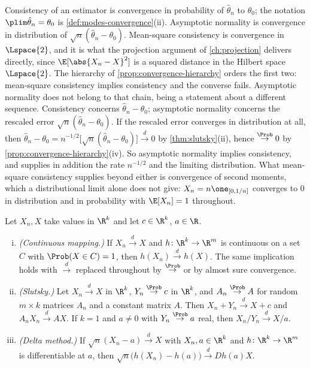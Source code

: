 \begin{remark}\label{rem:modes-econometrics}
	Consistency of an estimator is convergence in probability of
	$\hat\theta_n$ to $\theta_0$; the notation $\plim\hat\theta_n=\theta_0$ is
	\autoref{def:modes-convergence}(ii). Asymptotic normality is convergence in
	distribution of $\sqrt n(\hat\theta_n-\theta_0)$. Mean-square consistency is
	convergence in $\Lspace{2}$, and it is what the projection argument of
	\autoref{ch:projection} delivers directly, since
	$\E[\abs{X_n-X}^{2}]$ is a squared distance in the Hilbert space
	$\Lspace{2}$. The hierarchy of \autoref{prop:convergence-hierarchy} orders
	the first two: mean-square consistency implies consistency and the converse
	fails. Asymptotic normality does not belong to that chain, being a statement
	about a different sequence. Consistency concerns $\hat\theta_n-\theta_0$;
	asymptotic normality concerns the rescaled error
	$\sqrt n(\hat\theta_n-\theta_0)$. If the rescaled error converges in
	distribution at all, then
	$\hat\theta_n-\theta_0=n^{-1/2}\bigl[\sqrt n(\hat\theta_n-\theta_0)\bigr]
		\overset{d}{\to}0$ by \autoref{thm:slutsky}(ii), hence
	$\overset{\Prob}{\to}0$ by \autoref{prop:convergence-hierarchy}(iv). So
	asymptotic normality implies consistency, and supplies in addition the rate
	$n^{-1/2}$ and the limiting distribution. What mean-square consistency
	supplies beyond either is convergence of second moments, which a
	distributional limit alone does not give: $X_n=n\one_{[0,1/n]}$ converges to
	$0$ in distribution and in probability with $\E[X_n]=1$ throughout.
\end{remark}

\begin{theorem}\label{thm:slutsky}
	Let $X_n,X$ take values in $\R^{k}$ and let $c\in\R^{k}$, $a\in\R$.
	\begin{enumerate}[(i)]
		\item \emph{(Continuous mapping.)} If $X_n\overset{d}{\to}X$ and
		      $h\colon\R^{k}\to\R^{m}$ is continuous on a set $C$ with
		      $\Prob(X\in C)=1$, then $h(X_n)\overset{d}{\to}h(X)$. The same
		      implication holds with $\overset{d}{\to}$ replaced throughout by
		      $\overset{\Prob}{\to}$ or by almost sure convergence.
		\item \emph{(Slutsky.)} Let $X_n\overset{d}{\to}X$ in $\R^{k}$,
		      $Y_n\overset{\Prob}{\to}c$ in $\R^{k}$, and $A_n\overset{\Prob}{\to}A$
		      for random $m\times k$ matrices $A_n$ and a constant matrix $A$. Then
		      $X_n+Y_n\overset{d}{\to}X+c$ and $A_nX_n\overset{d}{\to}AX$. If
		      $k=1$ and $a\neq0$ with $Y_n\overset{\Prob}{\to}a$ real, then
		      $X_n/Y_n\overset{d}{\to}X/a$.
		\item \emph{(Delta method.)} If
		      $\sqrt n(X_n-a)\overset{d}{\to}X$ with $X_n,a\in\R^{k}$ and
		      $h\colon\R^{k}\to\R^{m}$ is differentiable at $a$, then
		      $\sqrt n\bigl(h(X_n)-h(a)\bigr)\overset{d}{\to}Dh(a)X$.
	\end{enumerate}
\end{theorem}

